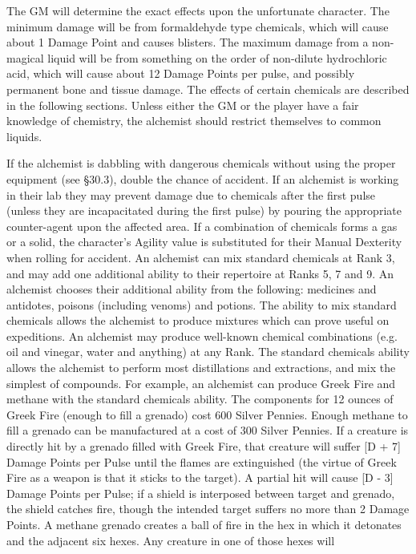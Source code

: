 \documentclass[a4paper]{article}
\begin{document}
\begin{multicols}{3}
The GM will determine the exact effects upon the
unfortunate character. The minimum damage will
be from formaldehyde type chemicals, which will
cause about 1 Damage Point and causes blisters.
The maximum damage from a non-magical liquid
will be from something on the order of non-dilute
hydrochloric acid, which will cause about 12 Damage Points per
pulse, and possibly permanent bone and tissue
damage. The effects of certain chemicals are described in the following sections. Unless either the
GM or the player have a fair knowledge of chemistry, the alchemist should restrict themselves to
common liquids.

If the alchemist is dabbling with dangerous chemicals without using the proper equipment (see
§30.3), double the chance of accident. If an alchemist is working in their lab they may prevent damage due to chemicals after the first pulse (unless
they are incapacitated during the first pulse) by
pouring the appropriate counter-agent upon the
affected area.
If a combination of chemicals forms a gas or a
solid, the character’s Agility value is substituted
for their Manual Dexterity when rolling for accident.
An alchemist can mix standard chemicals at
Rank 3, and may add one additional ability to
their repertoire at Ranks 5, 7 and 9.
An alchemist chooses their additional ability from
the following: medicines and antidotes, poisons
(including venoms) and potions.
The ability to mix standard chemicals allows the
alchemist to produce mixtures which can prove
useful on expeditions.
An alchemist may produce well-known chemical
combinations (e.g. oil and vinegar, water and anything) at any Rank. The standard chemicals ability
allows the alchemist to perform most distillations
and extractions, and mix the simplest of compounds.
For example, an alchemist can produce Greek Fire
and methane with the standard chemicals ability.
The components for 12 ounces of Greek Fire
(enough to fill a grenado) cost 600 Silver Pennies.
Enough methane to fill a grenado can be manufactured at a cost of 300 Silver Pennies. If a creature is
directly hit by a grenado filled with Greek Fire,
that creature will suffer [D + 7] Damage Points per
Pulse until the flames are extinguished (the virtue
of Greek Fire as a weapon is that it sticks to the
target). A partial hit will cause [D - 3] Damage
Points per Pulse; if a shield is interposed between
target and grenado, the shield catches fire, though
the intended target suffers no more than 2 Damage
Points. A methane grenado creates a ball of fire in
the hex in which it detonates and the adjacent six
hexes. Any creature in one of those hexes will

\end{multicols}
\end{document}
